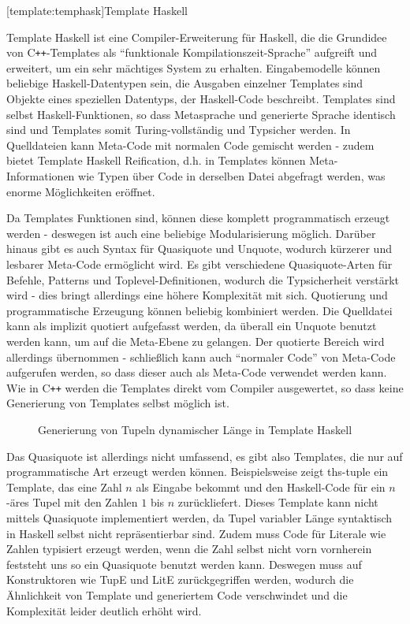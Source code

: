 \documentclass[11pt, a4paper, bibgerm]{scrbook}
\newcommand\lsection{}
\newcommand\abb{}
\newcommand{\cpp}{C\texttt{++}}
\begin{document}
\lsection[template:temphask]{Template Haskell}

Template Haskell ist eine Compiler-Erweiterung für Haskell, die die
Grundidee von \cpp{}-Templates als "`funktionale
Kompilationszeit-Sprache"' aufgreift und erweitert, um ein sehr
mächtiges System zu erhalten. Eingabemodelle können beliebige
Haskell-Datentypen sein, die Ausgaben einzelner Templates sind Objekte
eines speziellen Datentyps, der Haskell-Code beschreibt. Templates sind
selbst Haskell-Funktionen, so dass Metasprache und generierte Sprache
identisch sind und Templates somit Turing-vollständig und Typsicher
werden. In Quelldateien kann Meta-Code mit normalen Code gemischt werden
- zudem bietet Template Haskell Reification, d.h. in Templates können
Meta-Informationen wie Typen über Code in derselben Datei abgefragt
werden, was enorme Möglichkeiten eröffnet.

Da Templates Funktionen sind, können diese komplett programmatisch
erzeugt werden - deswegen ist auch eine beliebige Modularisierung
möglich. Darüber hinaus gibt es auch Syntax für Quasiquote und Unquote,
wodurch kürzerer und lesbarer Meta-Code ermöglicht wird. Es gibt
verschiedene Quasiquote-Arten für Befehle, Patterns und
Toplevel-Definitionen, wodurch die Typsicherheit verstärkt wird - dies
bringt allerdings eine höhere Komplexität mit sich. Quotierung und
programmatische Erzeugung können beliebig kombiniert werden. Die
Quelldatei kann als implizit quotiert aufgefasst werden, da überall ein
Unquote benutzt werden kann, um auf die Meta-Ebene zu gelangen. Der
quotierte Bereich wird allerdings übernommen - schließlich kann auch
"`normaler Code"' von Meta-Code aufgerufen werden, so dass dieser auch
als Meta-Code verwendet werden kann. Wie in \cpp{} werden die Templates
direkt vom Compiler ausgewertet, so dass keine Generierung von Templates
selbst möglich ist.

\begin{figure}[h]
  \centering
  \caption{Generierung von Tupeln dynamischer Länge in Template Haskell}
  \label{magicl:fig:ths-tuple}
\end{figure}

Das Quasiquote ist allerdings nicht umfassend, es gibt also Templates, die
nur auf programmatische Art erzeugt werden können. Beispielsweise zeigt
\abb{ths-tuple} ein Template, das eine Zahl $n$ als Eingabe bekommt und
den Haskell-Code für ein $n$-äres Tupel mit den Zahlen $1$ bis $n$
zurückliefert. Dieses Template kann nicht mittels Quasiquote implementiert
werden, da Tupel variabler Länge syntaktisch in Haskell selbst nicht
repräsentierbar sind. Zudem muss Code für Literale wie Zahlen typisiert
erzeugt werden, wenn die Zahl selbst nicht vorn vornherein feststeht uns
so ein Quasiquote benutzt werden kann. Deswegen muss auf Konstruktoren wie
TupE und LitE zurückgegriffen werden, wodurch die Ähnlichkeit von
Template und generiertem Code verschwindet und die Komplexität leider
deutlich erhöht wird.
\end{document}
